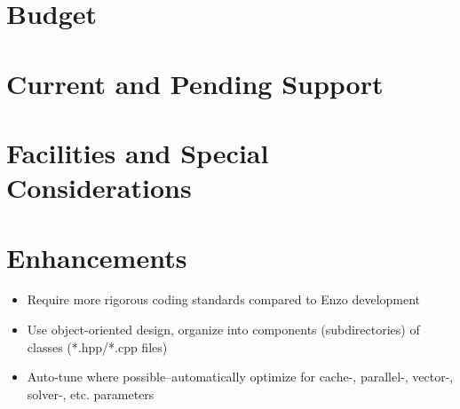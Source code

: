 \documentclass{article}
\begin{document}
\section{Budget}
\section{Current and Pending Support}
\section{Facilities and Special Considerations}

\section{Enhancements}

\begin{itemize}
 \item Require more rigorous coding standards compared to Enzo development
 \item Use object-oriented design, organize into components (subdirectories) of classes (*.hpp/*.cpp files)
 \item Auto-tune where possible--automatically optimize for cache-, parallel-, vector-, solver-, etc. parameters
\end{itemize}

\end{document}
